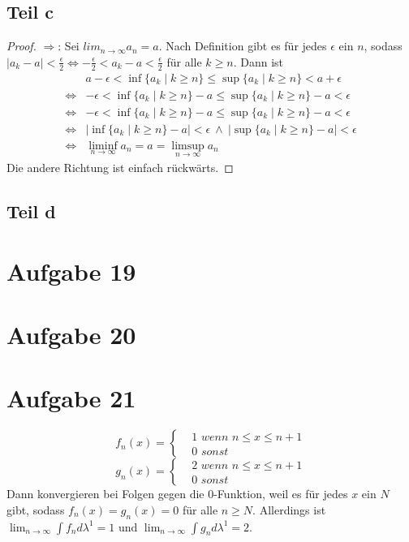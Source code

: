 \documentclass[10pt,a4paper]{article}
\begin{document}
\subsection{Teil c}
\begin{proof}
  $\Rightarrow$: Sei $lim_{n \rightarrow \infty} a_{n} = a$.
  Nach Definition gibt es für jedes $\epsilon$ ein $n$, sodass $|a_{k} - a| < \frac{\epsilon}{2} \Leftrightarrow -\frac{\epsilon}{2} < a_{k} - a < \frac{\epsilon}{2}$ für alle $k \ge n$.
  Dann ist
  \begin{align*}
    & a - \epsilon < \inf \{ a_{k} \mid k \ge n \} \le \sup \{ a_{k} \mid k \ge n \} < a + \epsilon\\
    \Leftrightarrow & -\epsilon < \inf \{ a_{k} \mid k \ge n \} - a \le \sup \{ a_{k} \mid k \ge n \} - a < \epsilon\\
    \Leftrightarrow & -\epsilon < \inf \{ a_{k} \mid k \ge n \} - a \le \sup \{ a_{k} \mid k \ge n \} - a < \epsilon\\
    \Leftrightarrow & |\inf \{ a_{k} \mid k \ge n \} - a| < \epsilon\ \land\ |\sup \{ a_{k} \mid k \ge n \} - a| < \epsilon\\
    \Leftrightarrow & \liminf_{n \rightarrow \infty} a_{n} = a = \limsup_{n \rightarrow \infty} a_{n}
  \end{align*}
  Die andere Richtung ist einfach rückwärts.
\end{proof}

\subsection{Teil d}

\section{Aufgabe 19}

\section{Aufgabe 20}

\section{Aufgabe 21}
\begin{equation}
  f_{n}(x) = 
  \begin{cases}
    & 1\textit{ wenn $n \le x \le n + 1$}\\
    & 0\textit{ sonst}
  \end{cases}
\end{equation}
\begin{equation}
  g_{n}(x) = 
  \begin{cases}
    & 2\textit{ wenn $n \le x \le n + 1$}\\
    & 0\textit{ sonst}
  \end{cases}
\end{equation}
Dann konvergieren bei Folgen gegen die $0$-Funktion, weil es für jedes $x$ ein $N$ gibt, sodass $f_{n}(x) = g_{n}(x) = 0$ für alle $n \ge N$.
Allerdings ist $\lim_{n \rightarrow \infty} \int f_{n} d \lambda^{1} = 1$ und $\lim_{n \rightarrow \infty} \int g_{n} d \lambda^{1} = 2$.
\end{document}
